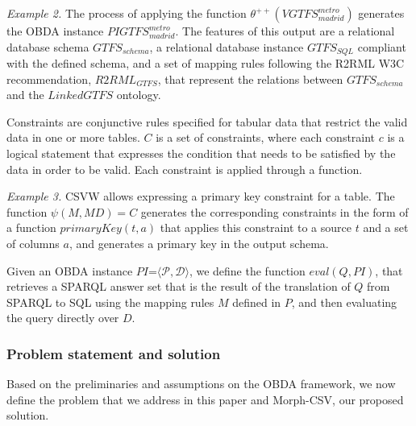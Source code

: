 \textit{Example 2.} The process of applying the function $\theta^{++}(VGTFS^{metro}_{madrid})$ generates the OBDA instance $PIGTFS^{metro}_{madrid}$. The features of this output are a relational database schema $GTFS_{schema}$, a relational database instance $GTFS_{SQL}$ compliant with the defined schema, and a set of mapping rules following the R2RML W3C recommendation, $R2RML_{GTFS}$, that represent the relations between $GTFS_{schema}$ and the $LinkedGTFS$ ontology. 


Constraints are conjunctive rules specified for tabular data that restrict the valid data in one or more tables. $C$ is a set of constraints, where each constraint $c$ is a logical statement that expresses the condition that needs to be satisfied by the data in order to be valid. Each constraint is applied through a function.

\textit{Example 3.} CSVW allows expressing a primary key constraint for a table. The function $\psi(M,MD)=C$ generates the corresponding constraints in the form of a function $primaryKey(t,a)$ that applies this constraint to a source $t$ and a set of columns $a$, and generates a primary key in the output schema. 

Given an OBDA instance $PI$=$\langle\mathcal{P,D}\rangle$, we define the function $eval(Q,PI)$, that retrieves a SPARQL answer set that is the result of the translation of $Q$ from SPARQL to SQL using the mapping rules $M$ defined in $P$, and then evaluating the query directly over $D$. 


\subsubsection{Problem statement and solution}
Based on the preliminaries and assumptions on the OBDA framework, we now define the problem that we address in this paper and Morph-CSV, our proposed solution.

